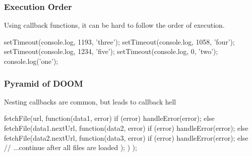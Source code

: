 \begin{frame}[fragile] \frametitle{Execution Order}
Using callback functions, it can be hard to follow the order of execution.
\vspace{5mm}
\begin{CodeBox}{}
setTimeout(console.log, 1193, 'three');
setTimeout(console.log, 1058, 'four');
setTimeout(console.log, 1234, 'five');
setTimeout(console.log, 0, 'two');
console.log('one');
\end{CodeBox}
\end{frame}

\begin{frame}[fragile] \frametitle{Pyramid of DOOM}
Nesting callbacks are common, but leads to callback hell
\vspace{5mm}
\begin{CodeBox}{}
fetchFile(url, function(data1, error) {
  if (error) {
    handleError(error);
  } else {
    fetchFile(data1.nextUrl, function(data2, error) {
      if (error) {
        handleError(error);
      } else {
        fetchFile(data2.nextUrl, function(data3, error) {
          if (error) {
            handleError(error);
          } else {
            // ...continue after all files are loaded
          }
        });
      }
    })
  }
});\end{CodeBox}
\end{frame}
